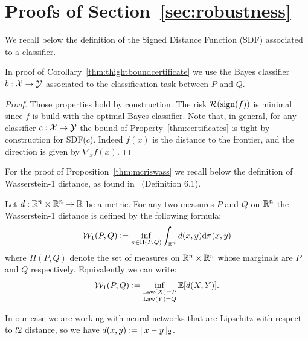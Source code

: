 \section{Proofs of Section~\ref{sec:robustness}}\label{app:robustness}

        We recall below the definition of the Signed Distance Function (SDF) associated to a classifier.
        
        \nlctwoclasses*
        
        In proof of Corollary~\ref{thm:thightboundcertificate} we use the Bayes classifier $b:\mathcal{X}\rightarrow\mathcal{Y}$ associated to the classification task between $P$ and $Q$.  

        \thightboundcertificate*
    
        \begin{proof} Those properties hold by construction. The risk $\mathcal{R}(\text{sign}{(f)})$ is minimal since $f$ is build with the optimal Bayes classifier. Note that, in general, for any classifier $c:\mathcal{X}\rightarrow\mathcal{Y}$ the bound of Property~\ref{thm:certificates} is tight by construction for SDF($c$). Indeed $f(x)$ is the distance to the frontier, and the direction is given by $\nabla_xf(x)$. 
        \end{proof}
        
        For the proof of Proposition~\ref{thm:mcriswass} we recall below the definition of Wasserstein-1 distance, as found in~\cite{villani2008optimal} (Definition 6.1).  
          
        \begin{definition}\label{def:wasserstein}
        Let $d:\mathbb{R}^n\times\mathbb{R}^n\rightarrow\mathbb{R}$ be a metric. For any two measures $P$ and $Q$ on $\mathbb{R}^n$ the Wasserstein-1 distance is defined by the following formula:
        $$\mathcal{W}_1(P,Q)\vcentcolon=\inf_{\pi\in\Pi(P,Q)}\int_{\mathbb{R}^n}d(x,y)\mathrm{d}\pi(x,y)$$
        where $\Pi(P,Q)$ denote the set of measures on $\mathbb{R}^n\times\mathbb{R}^n$ whose marginals are $P$ and $Q$ respectively. Equivalently we can write:
        $$\mathcal{W}_1(P,Q)\vcentcolon=\inf_{\substack{\text{Law}(X)=P\\\text{Law}(Y)=Q}} \mathbb{E}{[d(X,Y)]}.$$
        \end{definition}
        
        In our case we are working with neural networks that are Lipschitz with respect to $l2$ distance, so we have $d(x,y) \vcentcolon= \|x-y\|_2$.  
        
